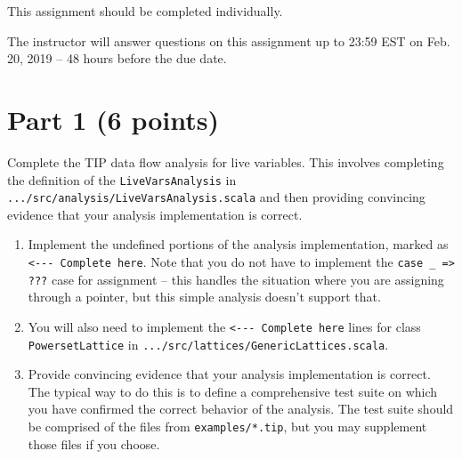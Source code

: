 \documentclass[12pt,letterpaper]{article}
\begin{document}
This assignment should be completed individually.

The instructor will answer questions on this assignment up to 23:59 EST on Feb. 20, 2019 -- 48 hours before the due date. 

\section*{Part 1 (6 points)}
Complete the TIP data flow analysis for live variables.  This involves
completing the definition of the \texttt{LiveVarsAnalysis} in \texttt{.../src/analysis/LiveVarsAnalysis.scala} and then providing convincing evidence
that your analysis implementation is correct.
\begin{enumerate}
\item Implement the undefined portions of the analysis implementation, marked as\\
 \verb|<--- Complete here|.  Note that you do not have to 
implement the \verb|case _ => ???| case for assignment -- this handles the situation where you are assigning through a pointer, but this simple analysis doesn't support that.
\item You will also need to implement the \verb|<--- Complete here| lines for class \texttt{PowersetLattice} in \texttt{.../src/lattices/GenericLattices.scala}.
\item Provide convincing evidence that your analysis implementation is correct.  The typical way to do this is to define a comprehensive test suite on which you have confirmed the correct behavior of the analysis.  The test suite should be comprised of the files from \texttt{examples/*.tip}, but you may supplement those files if you choose.
\end{enumerate}
\end{document}

